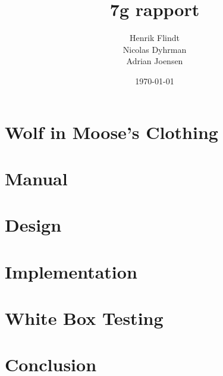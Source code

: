 \documentclass{article}
\title{7g rapport}
\author{Henrik Flindt\\Nicolas Dyhrman\\Adrian Joensen}
\date{\today}
\begin{document}
    \maketitle
    
    \section*{Wolf in Moose's Clothing}
    \section{Manual}
   
    
    \section{Design}
        
        

    \section{Implementation}
       
         
    \section{White Box Testing}
   	   
    \section{Conclusion}
     
\end{document}
